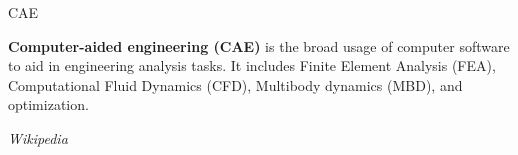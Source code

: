 \documentclass[12pt,xcolor=pst]{beamer}
\begin{document}
\begin{frame}{CAE}

	\transdissolve[duration=0.1]
	\justifying
	\large
	\textbf{Computer-aided engineering (CAE)} is the broad usage of computer software to aid in engineering analysis tasks. It includes Finite Element Analysis (FEA), Computational Fluid Dynamics (CFD), Multibody dynamics (MBD), and optimization.
	
	\begin{flushright}

		\textit{Wikipedia}

	\end{flushright}

\end{frame}
\end{document}
